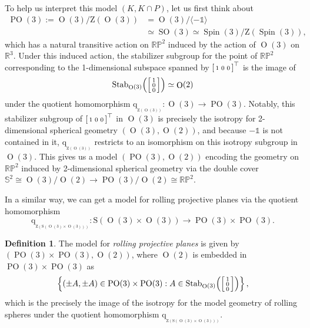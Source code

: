 \documentclass[12pt,a4paper]{amsart}
\theoremstyle{definition}
\newtheorem{definition}[theorem]{Definition}
\DeclareMathOperator{\Orth}{O}
\DeclareMathOperator{\SOrth}{SO}
\DeclareMathOperator{\Spin}{Spin}
\DeclareMathOperator{\POrth}{PO}
\newcommand{\quot}[1]{\mathrm{q}_{{}_{#1}}}
\newenvironment{smallbmatrix}
  {\left[\begin{smallmatrix}}
  {\end{smallmatrix}\right]}
\begin{document}
To help us interpret this model $(K,K\cap P)$, let us first think about
\begin{align*}\POrth(3):=\Orth(3)/\mathrm{Z}(\Orth(3)) & =\Orth(3)/\langle-\mathds{1}\rangle \\ & \simeq\SOrth(3)\simeq\Spin(3)/\mathrm{Z}(\Spin(3)),\end{align*}
which has a natural transitive action on $\mathbb{RP}^2$ induced by the action of $\Orth(3)$ on $\mathbb{R}^3$. Under this induced action, the stabilizer subgroup for the point of $\mathbb{RP}^2$ corresponding to the 1-dimensional subspace spanned by $\begin{smallbmatrix}1 & 0 & 0\end{smallbmatrix}^\top$ is the image of
\[\mathrm{Stab}_{\Orth(3)}\!\left(\begin{smallbmatrix}1 \\ 0 \\ 0\end{smallbmatrix}\right)\simeq\Orth(2)\]
under the quotient homomorphism $\quot{\mathrm{Z}(\Orth(3))}\!:\Orth(3)\to\POrth(3)$. Notably, this stabilizer subgroup of $\begin{smallbmatrix}1 & 0 & 0\end{smallbmatrix}^\top$ in $\Orth(3)$ is precisely the isotropy for 2-dimensional spherical geometry $(\Orth(3),\Orth(2))$, and because $-\mathds{1}$ is not contained in it, $\quot{\mathrm{Z}(\Orth(3))}\!$ restricts to an isomorphism on this isotropy subgroup in $\Orth(3)$. This gives us a model $(\POrth(3),\Orth(2))$ encoding the geometry on $\mathbb{RP}^2$ induced by 2-dimensional spherical geometry via the double cover $\mathbb{S}^2\cong\Orth(3)/\Orth(2)\to\POrth(3)/\Orth(2)\cong\mathbb{RP}^2$.

In a similar way, we can get a model for rolling projective planes via the quotient homomorphism
\[\quot{\mathrm{Z}(\mathrm{S}(\Orth(3)\times\Orth(3)))}\!:\mathrm{S}(\Orth(3)\times\Orth(3))\to\POrth(3)\times\POrth(3).\]

\begin{definition}The model for \emph{rolling projective planes} is given by $(\POrth(3)\times\POrth(3),\Orth(2))$, where $\Orth(2)$ is embedded in $\POrth(3)\times\POrth(3)$ as
\[\left\{(\pm A,\pm A)\in\POrth(3)\times\POrth(3):A\in\mathrm{Stab}_{\Orth(3)}\!\left(\begin{smallbmatrix}1 \\ 0 \\ 0\end{smallbmatrix}\right)\right\},\]
which is the precisely the image of the isotropy for the model geometry of rolling spheres under the quotient homomorphism $\quot{\mathrm{Z}(\mathrm{S}(\Orth(3)\times\Orth(3)))}$.\end{definition}
\end{document}
